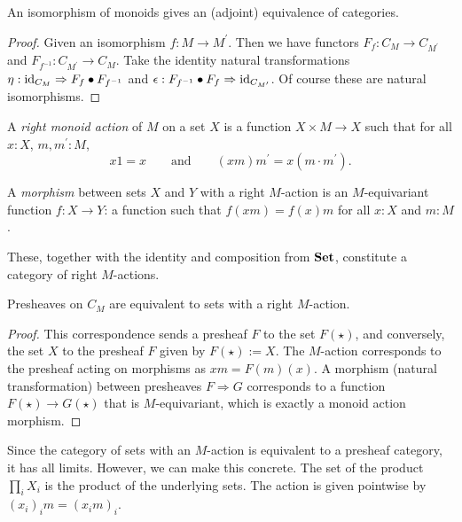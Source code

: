 \begin{lemma}
  An isomorphism of monoids gives an (adjoint) equivalence of categories.
\end{lemma}
\begin{proof}
  Given an isomorphism $ f: M \to M^\prime $. Then we have functors $ F_f: C_M \to C_{M^\prime} $ and $ F_{f^{-1}}: C_{M^\prime} \to C_M $. Take the identity natural transformations $ \eta: \text{id}_{C_M} \Rightarrow F_f \bullet F_{f^{-1}} $ and $ \epsilon: F_{f^{-1}} \bullet F_f \Rightarrow \text{id}_{C_{M^\prime}} $. Of course these are natural isomorphisms.
\end{proof}

\begin{definition}
  A \textit{right monoid action} of $ M $ on a set $ X $ is a function $ X \times M \to X $ such that for all $ x: X $, $ m, m^\prime: M $,
  \[ x 1 = x \qquad \text{and} \qquad (x m) m^\prime = x (m \cdot m^\prime). \]
\end{definition}

\begin{definition}
  A \textit{morphism} between sets $ X $ and $ Y $ with a right $ M $-action is an $ M $-equivariant function $ f: X \to Y $: a function such that $ f(xm) = f(x)m $ for all $ x: X $ and $ m: M $.
\end{definition}

These, together with the identity and composition from $ \mathbf{Set} $, constitute a category  of right $ M $-actions.

\begin{lemma}
  Presheaves on $ C_M $ are equivalent to sets with a right $ M $-action.
\end{lemma}
\begin{proof}
  This correspondence sends a presheaf $ F $ to the set $ F(\star) $, and conversely, the set $ X $ to the presheaf $ F $ given by $ F(\star) := X $. The $ M $-action corresponds to the presheaf acting on morphisms as $ xm = F(m)(x) $. A morphism (natural transformation) between presheaves $ F \Rightarrow G $ corresponds to a function $ F(\star) \to G(\star) $ that is $ M $-equivariant, which is exactly a monoid action morphism.
\end{proof}

\begin{remark}
  Since the category of sets with an $ M $-action is equivalent to a presheaf category, it has all limits. However, we can make this concrete. The set of the product $ \prod_i X_i $ is the product of the underlying sets. The action is given pointwise by $ (x_i)_i m = (x_i m)_i $.
\end{remark}


